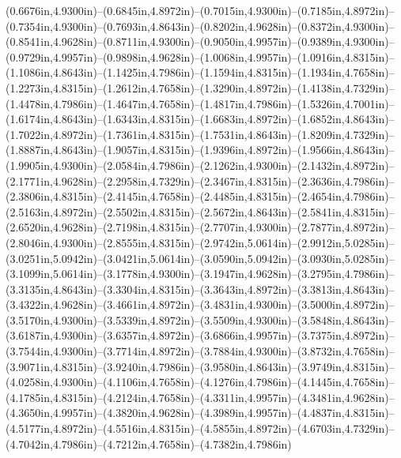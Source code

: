 (0.6676in,4.9300in)--(0.6845in,4.8972in)--(0.7015in,4.9300in)--(0.7185in,4.8972in)--(0.7354in,4.9300in)--(0.7693in,4.8643in)--(0.8202in,4.9628in)--(0.8372in,4.9300in)--(0.8541in,4.9628in)--(0.8711in,4.9300in)--(0.9050in,4.9957in)--(0.9389in,4.9300in)--(0.9729in,4.9957in)--(0.9898in,4.9628in)--(1.0068in,4.9957in)--(1.0916in,4.8315in)--(1.1086in,4.8643in)--(1.1425in,4.7986in)--(1.1594in,4.8315in)--(1.1934in,4.7658in)--(1.2273in,4.8315in)--(1.2612in,4.7658in)--(1.3290in,4.8972in)--(1.4138in,4.7329in)--(1.4478in,4.7986in)--(1.4647in,4.7658in)--(1.4817in,4.7986in)--(1.5326in,4.7001in)--(1.6174in,4.8643in)--(1.6343in,4.8315in)--(1.6683in,4.8972in)--(1.6852in,4.8643in)--(1.7022in,4.8972in)--(1.7361in,4.8315in)--(1.7531in,4.8643in)--(1.8209in,4.7329in)--(1.8887in,4.8643in)--(1.9057in,4.8315in)--(1.9396in,4.8972in)--(1.9566in,4.8643in)--(1.9905in,4.9300in)--(2.0584in,4.7986in)--(2.1262in,4.9300in)--(2.1432in,4.8972in)--(2.1771in,4.9628in)--(2.2958in,4.7329in)--(2.3467in,4.8315in)--(2.3636in,4.7986in)--(2.3806in,4.8315in)--(2.4145in,4.7658in)--(2.4485in,4.8315in)--(2.4654in,4.7986in)--(2.5163in,4.8972in)--(2.5502in,4.8315in)--(2.5672in,4.8643in)--(2.5841in,4.8315in)--(2.6520in,4.9628in)--(2.7198in,4.8315in)--(2.7707in,4.9300in)--(2.7877in,4.8972in)--(2.8046in,4.9300in)--(2.8555in,4.8315in)--(2.9742in,5.0614in)--(2.9912in,5.0285in)--(3.0251in,5.0942in)--(3.0421in,5.0614in)--(3.0590in,5.0942in)--(3.0930in,5.0285in)--(3.1099in,5.0614in)--(3.1778in,4.9300in)--(3.1947in,4.9628in)--(3.2795in,4.7986in)--(3.3135in,4.8643in)--(3.3304in,4.8315in)--(3.3643in,4.8972in)--(3.3813in,4.8643in)--(3.4322in,4.9628in)--(3.4661in,4.8972in)--(3.4831in,4.9300in)--(3.5000in,4.8972in)--(3.5170in,4.9300in)--(3.5339in,4.8972in)--(3.5509in,4.9300in)--(3.5848in,4.8643in)--(3.6187in,4.9300in)--(3.6357in,4.8972in)--(3.6866in,4.9957in)--(3.7375in,4.8972in)--(3.7544in,4.9300in)--(3.7714in,4.8972in)--(3.7884in,4.9300in)--(3.8732in,4.7658in)--(3.9071in,4.8315in)--(3.9240in,4.7986in)--(3.9580in,4.8643in)--(3.9749in,4.8315in)--(4.0258in,4.9300in)--(4.1106in,4.7658in)--(4.1276in,4.7986in)--(4.1445in,4.7658in)--(4.1785in,4.8315in)--(4.2124in,4.7658in)--(4.3311in,4.9957in)--(4.3481in,4.9628in)--(4.3650in,4.9957in)--(4.3820in,4.9628in)--(4.3989in,4.9957in)--(4.4837in,4.8315in)--(4.5177in,4.8972in)--(4.5516in,4.8315in)--(4.5855in,4.8972in)--(4.6703in,4.7329in)--(4.7042in,4.7986in)--(4.7212in,4.7658in)--(4.7382in,4.7986in) 